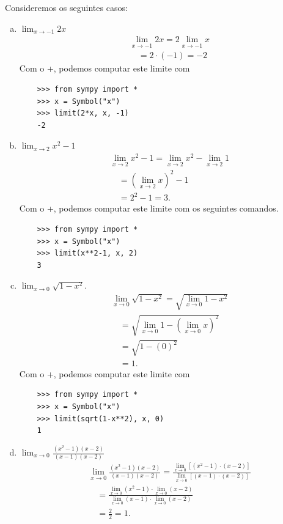 \begin{ex}
  Consideremos os seguintes casos:
  \begin{enumerate}[a)]
  \item $\displaystyle \lim_{x\to -1} 2x$
  \begin{align}
    & \lim_{x\to -1} 2x = 2\lim_{x\to -1} x\\
    & \text{}\quad = 2\cdot(-1) = -2
  \end{align}
  \ifispython
  Com o {\python}+{\sympy}, podemos computar este limite com
  \begin{lstlisting}
    >>> from sympy import *
    >>> x = Symbol("x")
    >>> limit(2*x, x, -1)
    -2
  \end{lstlisting}
  \fi
\item $\displaystyle \lim_{x\to 2} x^2 - 1$
  \begin{align}
    & \lim_{x\to 2} x^2 - 1 = \lim_{x\to 2} x^2 - \lim_{x\to 2} 1\\
    & \text{}\quad = \left(\lim_{x\to 2} x\right)^2 - 1\\
    & \text{}\quad = 2^2 - 1 = 3.
  \end{align}
  \ifispython
  Com o {\python}+{\sympy}, podemos computar este limite com os seguintes comandos.
  \begin{lstlisting}
    >>> from sympy import *
    >>> x = Symbol("x")
    >>> limit(x**2-1, x, 2)
    3
  \end{lstlisting}
  \fi
\item $\displaystyle \lim_{x\to 0} \sqrt{1-x^2}$.
  \begin{align}
    & \lim_{x\to 0} \sqrt{1-x^2} = \sqrt{\lim_{x\to 0} 1-x^2} \\
    & \text{}\quad = \sqrt{\lim_{x\to 0} 1 - \left(\lim_{x\to 0} x\right)^2} \\
    & \text{}\quad = \sqrt{1 - (0)^2} \\
    & \text{}\quad = 1.
  \end{align}
  \ifispython
  Com o {\python}+{\sympy}, podemos computar este limite com
  \begin{lstlisting}
    >>> from sympy import *
    >>> x = Symbol("x")
    >>> limit(sqrt(1-x**2), x, 0)
    1
  \end{lstlisting}
  \fi  
\item $\displaystyle \lim_{x\to 0} \frac{(x^2-1)(x-2)}{(x-1)(x-2)}$
  \begin{align}
    & \lim_{x\to 0} \frac{(x^2-1)(x-2)}{(x-1)(x-2)} = \frac{\displaystyle\lim_{x\to 0}\left[(x^2-1)\cdot(x-2)\right]}{\displaystyle\lim_{x\to 0} \left[(x-1)\cdot(x-2)\right]} \\
    & \text{}\quad = \frac{\displaystyle\lim_{x\to 0} (x^2-1)\cdot\lim_{x\to 0}(x-2)}{\displaystyle\lim_{x\to 0}(x-1)\cdot\lim_{x\to 0}(x-2)} \\
    & \text{}\quad = \frac{2}{2} = 1.
  \end{align}
  \end{enumerate}
\end{ex}

